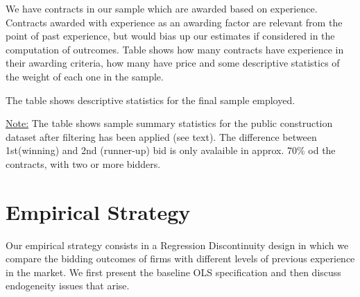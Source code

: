 We have contracts in our sample which are awarded based on experience. Contracts awarded with experience as an awarding factor are relevant from the point of past experience, but would bias up our estimates if considered in the computation of outrcomes. Table shows how many contracts have experience in their awarding criteria, how many have price and some descriptive statistics of the weight of each one in the sample.

The table shows descriptive statistics for the final sample employed.
\begin{table}[!h]

\caption{Descriptive Statistics}
\centering
{}
\vskip 0.5mm
{\raggedright \footnotesize \underline{Note:} The table shows sample summary statistics for the public construction dataset after filtering has been applied (see text). The difference between 1st(winning) and 2nd (runner-up) bid is only avalaible in approx. 70\% od the contracts, with two or more bidders. \par}
\end{table}

\section{Empirical Strategy}
Our empirical strategy consists in a Regression Discontinuity design in which we compare the bidding outcomes of firms with different levels of previous experience in the market. We first present the baseline OLS specification and then discuss endogeneity issues that arise.

